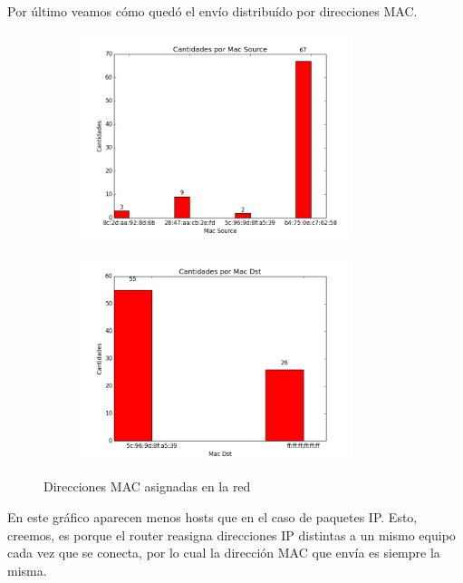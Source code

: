 \newpage

Por \'ultimo veamos c\'omo qued\'o el env\'io distribu\'ido por direcciones MAC.

\begin{figure}[H]

\begin{subfigure}{0.6\textwidth}
\includegraphics[width=0.9\linewidth, height=6cm]{imagenes/exp1/9cantidadMacSource}
\caption{}
\end{subfigure}
\begin{subfigure}{0.6\textwidth}
\includegraphics[width=0.9\linewidth, height=6cm]{imagenes/exp1/10cantidadMacDst}
\caption{}
\end{subfigure}

\caption{Direcciones MAC asignadas en la red}
\label{fig:1}
\end{figure}

En este gr\'afico aparecen menos hosts que en el caso de paquetes IP. Esto, creemos, es porque el router reasigna direcciones IP distintas a un mismo equipo cada vez que se conecta, por lo cual la direcci\'on MAC que env\'ia es siempre la misma.

